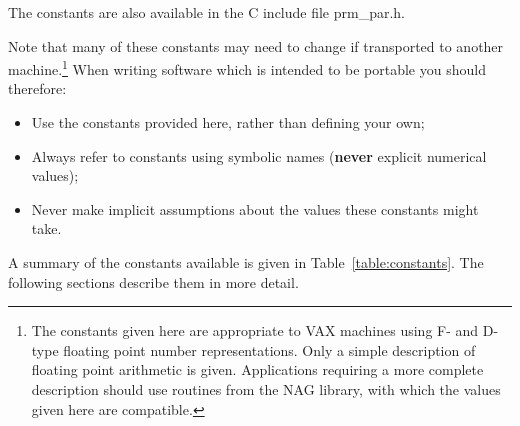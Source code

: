 \documentclass[11pt,nolof]{starlink}
\providecommand{\name}[1]{\mbox{#1}}
\begin{document}
The constants are also available in the C include file \name{prm\_par.h}.

Note that many of these constants may need to change if transported to
another machine.\footnote{
The constants given here are appropriate to \name{VAX} machines using F- and
D-type floating point number representations.
Only a simple description of floating point arithmetic is given.
Applications requiring a more complete description should use routines
from the \name{NAG} library, with which the values given here are compatible.}
When writing software which is intended to be portable you should therefore:

\begin{itemize}

\item Use the constants provided here, rather than defining your own;

\item Always refer to constants using symbolic names (\textbf{never} explicit
numerical values);

\item Never make implicit assumptions about the values these constants might
take.

\end{itemize}

A summary of the constants available is given in
Table~\ref{table:constants}.
The following sections describe them in more detail.
\end{document}
